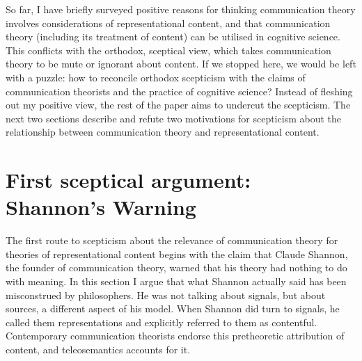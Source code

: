 \documentclass[12pt]{article}
\begin{document}


So far, I have briefly surveyed positive reasons for thinking communication theory involves considerations of representational content, and that communication theory (including its treatment of content) can be utilised in cognitive science.
This conflicts with the orthodox, sceptical view, which takes communication theory to be mute or ignorant about content.
If we stopped here, we would be left with a puzzle: how to reconcile orthodox scepticism with the claims of communication theorists and the practice of cognitive science?
Instead of fleshing out my positive view, the rest of the paper aims to undercut the scepticism.
The next two sections describe and refute two motivations for scepticism about the relationship between communication theory and representational content.



\section{First sceptical argument: Shannon's Warning}\label{sec:warning}

The first route to scepticism about the relevance of communication theory for theories of representational content begins with the claim that Claude Shannon, the founder of communication theory, warned that his theory had nothing to do with meaning.
In this section I argue that what Shannon actually said has been misconstrued by philosophers.
He was not talking about signals, but about sources, a different aspect of his model.
When Shannon did turn to signals, he called them representations and explicitly referred to them as contentful.
Contemporary communication theorists endorse this pretheoretic attribution of content, and teleosemantics accounts for it.
\end{document}
